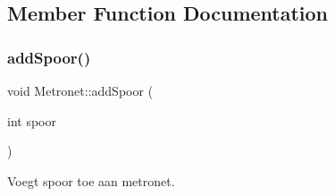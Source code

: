 \subsection{Member Function Documentation}
\mbox{\label{class_metronet_a0422381a8d7f32a915e0ad966af43627}} 
\subsubsection{\texorpdfstring{add\+Spoor()}{addSpoor()}}
{\footnotesize\ttfamily void Metronet\+::add\+Spoor (\begin{DoxyParamCaption}\item[{int}]{spoor }\end{DoxyParamCaption})}



Voegt spoor toe aan metronet. 


